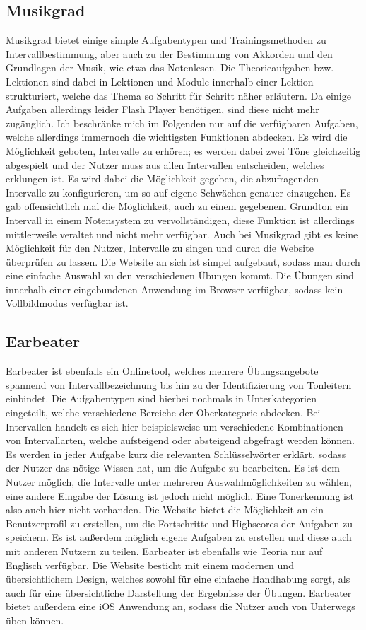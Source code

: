 \subsection*{Musikgrad}
\label{sec:Musikgrad}
Musikgrad bietet einige simple Aufgabentypen und Trainingsmethoden zu Intervallbestimmung, aber auch zu der Bestimmung von Akkorden und den Grundlagen der Musik, wie etwa das Notenlesen. Die Theorieaufgaben bzw. Lektionen sind dabei in Lektionen und Module innerhalb einer Lektion strukturiert, welche das Thema so Schritt für Schritt näher erläutern. Da einige Aufgaben allerdings leider Flash Player benötigen, sind diese nicht mehr zugänglich. Ich beschränke mich im Folgenden nur auf die verfügbaren Aufgaben, welche allerdings immernoch die wichtigsten Funktionen abdecken. Es wird die Möglichkeit geboten, Intervalle zu erhören; es werden dabei zwei Töne gleichzeitig abgespielt und der Nutzer muss aus allen Intervallen entscheiden, welches erklungen ist. Es wird dabei die Möglichkeit gegeben, die abzufragenden Intervalle zu konfigurieren, um so auf eigene Schwächen genauer einzugehen. Es gab offensichtlich mal die Möglichkeit, auch zu einem gegebenem Grundton ein Intervall in einem Notensystem zu vervollständigen, diese Funktion
ist allerdings mittlerweile veraltet und nicht mehr verfügbar. Auch bei Musikgrad gibt es keine Möglichkeit für den Nutzer, Intervalle zu singen und durch die Website überprüfen zu lassen. Die Website an sich ist simpel aufgebaut, sodass man durch eine einfache Auswahl zu den verschiedenen Übungen kommt. Die Übungen sind innerhalb einer eingebundenen Anwendung im Browser verfügbar, sodass kein Vollbildmodus verfügbar ist. \cite{musikgrad}


\subsection*{Earbeater}
\label{sec:Earbeater}
Earbeater ist ebenfalls ein Onlinetool, welches mehrere Übungsangebote spannend von Intervallbezeichnung bis hin zu der Identifizierung von Tonleitern einbindet. Die Aufgabentypen sind hierbei nochmals in Unterkategorien eingeteilt, welche verschiedene Bereiche der 
Oberkategorie abdecken. Bei Intervallen handelt es sich hier beispielsweise um verschiedene Kombinationen von Intervallarten, welche aufsteigend oder absteigend abgefragt werden können. Es werden in jeder Aufgabe kurz die relevanten Schlüsselwörter erklärt, sodass der Nutzer das nötige Wissen hat, um die Aufgabe zu bearbeiten. Es ist dem Nutzer möglich, die Intervalle unter mehreren Auswahlmöglichkeiten zu wählen, eine andere Eingabe der Lösung ist jedoch nicht möglich. Eine Tonerkennung ist also auch hier nicht vorhanden. Die Website bietet die Möglichkeit an ein Benutzerprofil zu erstellen, um die Fortschritte und Highscores der Aufgaben zu speichern. Es ist außerdem möglich eigene Aufgaben zu erstellen und diese 
auch mit anderen Nutzern zu teilen. Earbeater ist ebenfalls wie Teoria nur auf Englisch verfügbar. Die Website besticht mit einem modernen und übersichtlichem Design, welches sowohl für eine einfache Handhabung sorgt, als auch für eine übersichtliche Darstellung der Ergebnisse der Übungen. Earbeater bietet außerdem 
eine iOS Anwendung an, sodass die Nutzer auch von Unterwegs üben können. \cite{earbeater}

